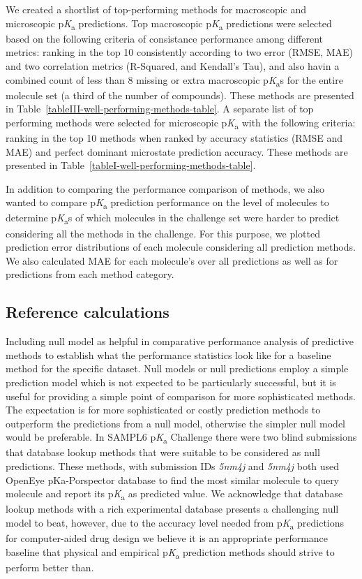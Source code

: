 \documentclass[9pt,lineno,final]{elife}
\newcommand{\pKa}{p\textit{K}\textsubscript{a}}
\begin{document}
We created a shortlist of top-performing methods for macroscopic and microscopic \pKa{} predictions. Top macroscopic \pKa{} predictions were selected based on the following criteria of consistance performance among different metrics: ranking in the top 10 consistently according to two error (RMSE, MAE) and two correlation metrics (R-Squared, and Kendall’s Tau), and also havin a combined count of less than 8 missing or extra macroscopic \pKa{}s for the entire molecule set (a third of the number of compounds). 
These methods are presented in Table~\ref{tableIII-well-performing-methods-table}. A separate list of top performing methods were selected for microscopic \pKa{} with the following criteria: ranking in the top 10 methods when ranked by accuracy statistics (RMSE and MAE) and perfect dominant microstate prediction accuracy. These methods are presented in Table~\ref{tableI-well-performing-methods-table}.

In addition to comparing the performance comparison of methods, we also wanted to compare \pKa{} prediction performance on the level of molecules to determine \pKa{}s of which molecules in the challenge set were harder to predict considering all the methods in the challenge. 
For this purpose, we plotted prediction error distributions of each molecule considering all prediction methods. 
We also calculated MAE for each molecule’s over all predictions as well as for predictions from each method category. 


\subsection{Reference calculations}

Including null model as helpful in comparative performance analysis of predictive methods to establish what the performance statistics look like for a baseline method for the specific dataset. 
Null models or null predictions employ a simple prediction model which is not expected to be particularly successful, but it is useful for providing a simple point of comparison for more sophisticated methods. The expectation is for more sophisticated or costly prediction methods to outperform the predictions from a null model, otherwise the simpler null model would be preferable. In SAMPL6 \pKa{} Challenge there were two blind submissions that database lookup methods that were suitable to be considered as null predictions. These methods, with submission IDs \textit{5nm4j} and \textit{5nm4j} both used OpenEye pKa-Porspector database to find the most similar molecule to query molecule and report its \pKa{} as predicted value. 
We acknowledge that database lookup methods with a rich experimental database presents a challenging null model to beat, however, due to the accuracy level needed from \pKa{} predictions for computer-aided drug design we believe it is an appropriate performance baseline that physical and empirical \pKa{} prediction methods should strive to perform better than.
\end{document}
